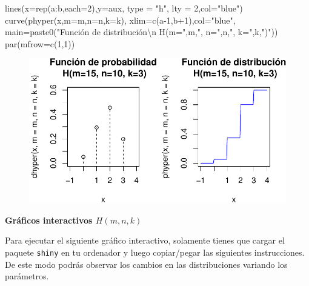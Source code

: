 \documentclass[
  letterpaper,
  DIV=11,
  numbers=noendperiod]{scrreprt}
\newenvironment{Shaded}{\begin{snugshade}}{\end{snugshade}}
\newcommand{\AttributeTok}[1]{\textcolor[rgb]{0.40,0.45,0.13}{#1}}
\newcommand{\DecValTok}[1]{\textcolor[rgb]{0.68,0.00,0.00}{#1}}
\newcommand{\FunctionTok}[1]{\textcolor[rgb]{0.28,0.35,0.67}{#1}}
\newcommand{\NormalTok}[1]{\textcolor[rgb]{0.00,0.23,0.31}{#1}}
\newcommand{\SpecialCharTok}[1]{\textcolor[rgb]{0.37,0.37,0.37}{#1}}
\newcommand{\StringTok}[1]{\textcolor[rgb]{0.13,0.47,0.30}{#1}}
\begin{document}
\begin{Shaded}
\begin{Highlighting}[]
\FunctionTok{lines}\NormalTok{(}\AttributeTok{x=}\FunctionTok{rep}\NormalTok{(a}\SpecialCharTok{:}\NormalTok{b,}\AttributeTok{each=}\DecValTok{2}\NormalTok{),}\AttributeTok{y=}\NormalTok{aux, }\AttributeTok{type =} \StringTok{"h"}\NormalTok{, }\AttributeTok{lty =} \DecValTok{2}\NormalTok{,}\AttributeTok{col=}\StringTok{"blue"}\NormalTok{)}
\FunctionTok{curve}\NormalTok{(}\FunctionTok{phyper}\NormalTok{(x,}\AttributeTok{m=}\NormalTok{m,}\AttributeTok{n=}\NormalTok{n,}\AttributeTok{k=}\NormalTok{k),}
  \AttributeTok{xlim=}\FunctionTok{c}\NormalTok{(a}\DecValTok{{-}1}\NormalTok{,b}\SpecialCharTok{+}\DecValTok{1}\NormalTok{),}\AttributeTok{col=}\StringTok{"blue"}\NormalTok{,}
  \AttributeTok{main=}\FunctionTok{paste0}\NormalTok{(}\StringTok{"Función de distribución}\SpecialCharTok{\textbackslash{}n}\StringTok{ H(m="}\NormalTok{,m,}\StringTok{", n="}\NormalTok{,n,}\StringTok{", k="}\NormalTok{,k,}\StringTok{")"}\NormalTok{))}
\FunctionTok{par}\NormalTok{(}\AttributeTok{mfrow=}\FunctionTok{c}\NormalTok{(}\DecValTok{1}\NormalTok{,}\DecValTok{1}\NormalTok{))}
\end{Highlighting}
\end{Shaded}

\begin{figure}

{\centering \includegraphics{3_files/figure-pdf/unnamed-chunk-62-1.pdf}

}

\end{figure}

\textbf{Gráficos interactivos \(H(m,n,k)\)}

Para ejecutar el siguiente gráfico interactivo, solamente tienes que
cargar el paquete \texttt{shiny} en tu ordenador y luego copiar/pegar
las siguientes instrucciones. De este modo podrás observar los cambios
en las distribuciones variando los parámetros.
\end{document}

